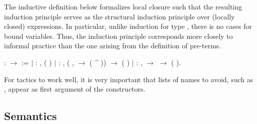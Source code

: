 \documentclass[12pt]{report}
\begin{document}
    The inductive definition below formalizes local closure such that
    the resulting induction principle serves as the structural
    induction principle over (locally closed) expressions.  In
    particular, unlike induction for type , there is no cases
    for bound variables.  Thus, the induction principle corresponds more
    closely to informal practice than the one arising from the
    definition of pre-terms.
\begin{coqdoccode}
\coqdocemptyline
\coqdocnoindent
{}  :  \ensuremath{\rightarrow}  :=\coqdoceol
\coqdocindent{1.00em}
\ensuremath{|}  : \coqdockw{\ensuremath{\forall}} ,\coqdoceol
\coqdocindent{3.00em}
 ( )\coqdoceol
\coqdocindent{1.00em}
\ensuremath{|}  : \coqdockw{\ensuremath{\forall}}  ,\coqdoceol
\coqdocindent{3.00em}
(\coqdockw{\ensuremath{\forall}} ,    \ensuremath{\rightarrow}  ( \^{} )) \ensuremath{\rightarrow}\coqdoceol
\coqdocindent{3.00em}
 ( )\coqdoceol
\coqdocindent{1.00em}
\ensuremath{|}  : \coqdockw{\ensuremath{\forall}}  ,\coqdoceol
\coqdocindent{3.00em}
  \ensuremath{\rightarrow} \coqdoceol
\coqdocindent{3.00em}
  \ensuremath{\rightarrow} \coqdoceol
\coqdocindent{3.00em}
 (  ).\coqdoceol
\coqdocemptyline
\end{coqdoccode}
For tactics to work well, it is very important that lists of
    names to avoid, such as , appear as first argument of the
    constructors. 
\begin{coqdoccode}
\coqdocemptyline
\end{coqdoccode}
\subsection{Semantics}
\end{document}
